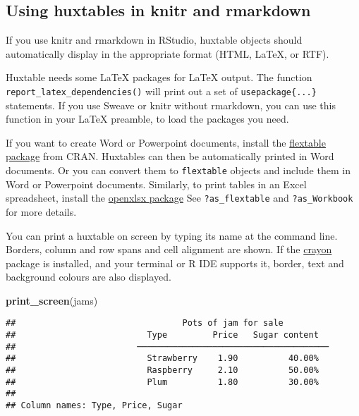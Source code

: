 \documentclass[]{article}
\newenvironment{Shaded}{\begin{snugshade}}{\end{snugshade}}
\newcommand{\KeywordTok}[1]{\textcolor[rgb]{0.13,0.29,0.53}{\textbf{#1}}}
\newcommand{\NormalTok}[1]{#1}
\begin{document}
\FloatBarrier

\hypertarget{using-huxtables-in-knitr-and-rmarkdown}{%
\subsection{Using huxtables in knitr and
rmarkdown}\label{using-huxtables-in-knitr-and-rmarkdown}}

If you use knitr and rmarkdown in RStudio, huxtable objects should
automatically display in the appropriate format (HTML, LaTeX, or RTF).

Huxtable needs some LaTeX packages for LaTeX output. The function
\texttt{report\_latex\_dependencies()} will print out a set of
\texttt{usepackage\{...\}} statements. If you use Sweave or knitr
without rmarkdown, you can use this function in your LaTeX preamble, to
load the packages you need.

If you want to create Word or Powerpoint documents, install the
\href{https://cran.r-project.org/package=flextable}{flextable package}
from CRAN. Huxtables can then be automatically printed in Word
documents. Or you can convert them to \texttt{flextable} objects and
include them in Word or Powerpoint documents. Similarly, to print tables
in an Excel spreadsheet, install the
\href{https://cran.r-project.org/package=openxlsx}{openxlsx package} See
\texttt{?as\_flextable} and \texttt{?as\_Workbook} for more details.

You can print a huxtable on screen by typing its name at the command
line. Borders, column and row spans and cell alignment are shown. If the
\href{https://cran.r-project.org/package=crayon}{crayon} package is
installed, and your terminal or R IDE supports it, border, text and
background colours are also displayed.

\begin{Shaded}
\begin{Highlighting}[]
\KeywordTok{print_screen}\NormalTok{(jams)}
\end{Highlighting}
\end{Shaded}

\begin{verbatim}
##                                 Pots of jam for sale                                 
##                          Type         Price   Sugar content  
##                        ──────────────────────────────────────
##                          Strawberry    1.90          40.00%  
##                          Raspberry     2.10          50.00%  
##                          Plum          1.80          30.00%  
## 
## Column names: Type, Price, Sugar
\end{verbatim}
\end{document}
